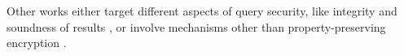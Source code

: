 		Other works either target different aspects of query security, like integrity and soundness of results \cite{knn-integrity-soundness,svknn}, or involve mechanisms other than property-preserving encryption \cite{seceqp,practical-approx-knn,knn-sharing-keys,knn-mult-data-owners,knn-over-encrypted,knn-paillier,knn-blind,knn-homomorphism,knn-strong-location-privacy,knn-no-anonymizers,knn-efficient,knn-new-casper}.
